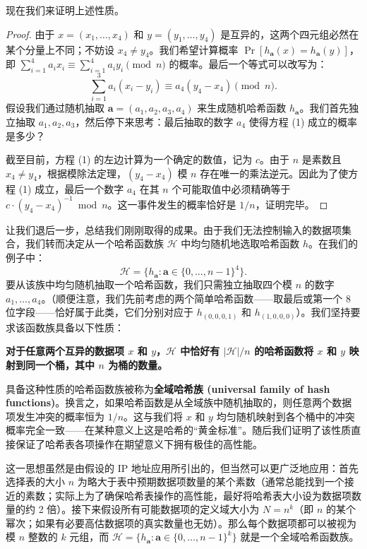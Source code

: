 现在我们来证明上述性质。

\begin{proof}
由于 $x = (x_1, \dots, x_4)$ 和 $y = (y_1, \dots, y_4)$ 是互异的，这两个四元组必然在某个分量上不同；不妨设 $x_4 \ne y_4$。我们希望计算概率 $\Pr[h_{\bm{a}}(x) = h_{\bm{a}}(y)]$，即 $\sum_{i=1}^4 a_i x_i \equiv \sum_{i=1}^4 a_i y_i \pmod n$ 的概率。最后一个等式可以改写为：
\begin{equation}
\sum_{i=1}^3 a_i (x_i - y_i) \equiv a_4 (y_4 - x_4) \pmod n. \tag{1}
\end{equation}
假设我们通过随机抽取 $\bm{a} = (a_1, a_2, a_3, a_4)$ 来生成随机哈希函数 $h_{\bm{a}}$。我们首先独立抽取 $a_1, a_2, a_3$，然后停下来思考：最后抽取的数字 $a_4$ 使得方程 (1) 成立的概率是多少？

截至目前，方程 (1) 的左边计算为一个确定的数值，记为 $c$。由于 $n$ 是素数且 $x_4 \ne y_4$，根据模除法定理，$(y_4 - x_4)$ 模 $n$ 存在唯一的乘法逆元。因此为了使方程 (1) 成立，最后一个数字 $a_4$ 在其 $n$ 个可能取值中必须精确等于 $c \cdot (y_4 - x_4)^{-1} \bmod n$。这一事件发生的概率恰好是 $1/n$，证明完毕。
\end{proof}

让我们退后一步，总结我们刚刚取得的成果。由于我们无法控制输入的数据项集合，我们转而决定从一个哈希函数族 $\mathcal{H}$ 中均匀随机地选取哈希函数 $h$。在我们的例子中：
\[
\mathcal{H} = \{h_{\bm{a}} : \bm{a} \in \{0, \dots, n-1\}^4\}.
\]
要从该族中均匀随机抽取一个哈希函数，我们只需独立抽取四个模 $n$ 的数字 $a_1, \dots, a_4$。（顺便注意，我们先前考虑的两个简单哈希函数——取最后或第一个 8 位字段——恰好属于此类，它们分别对应于 $h_{(0,0,0,1)}$ 和 $h_{(1,0,0,0)}$）。我们坚持要求该函数族具备以下性质：
\begin{center}
    \textbf{对于任意两个互异的数据项 $x$ 和 $y$，$\mathcal{H}$ 中恰好有 $|\mathcal{H}|/n$ 的哈希函数将 $x$ 和 $y$ 映射到同一个桶，其中 $n$ 为桶的数量。}
\end{center}
具备这种性质的哈希函数族被称为\textbf{全域哈希族 (universal family of hash functions)}。换言之，如果哈希函数是从全域族中随机抽取的，则任意两个数据项发生冲突的概率恒为 $1/n$。这与我们将 $x$ 和 $y$ 均匀随机映射到各个桶中的冲突概率完全一致——在某种意义上这是哈希的“黄金标准”。随后我们证明了该性质直接保证了哈希表各项操作在期望意义下拥有极佳的高性能。

这一思想虽然是由假设的 IP 地址应用所引出的，但当然可以更广泛地应用：首先选择表的大小 $n$ 为略大于表中预期数据项数量的某个素数（通常总能找到一个接近的素数；实际上为了确保哈希表操作的高性能，最好将哈希表大小设为数据项数量的约 2 倍）。接下来假设所有可能数据项的定义域大小为 $N = n^k$（即 $n$ 的某个幂次；如果有必要高估数据项的真实数量也无妨）。那么每个数据项都可以被视为模 $n$ 整数的 $k$ 元组，而 $\mathcal{H} = \{h_{\bm{a}} : \bm{a} \in \{0, \dots, n-1\}^k\}$ 就是一个全域哈希函数族。

